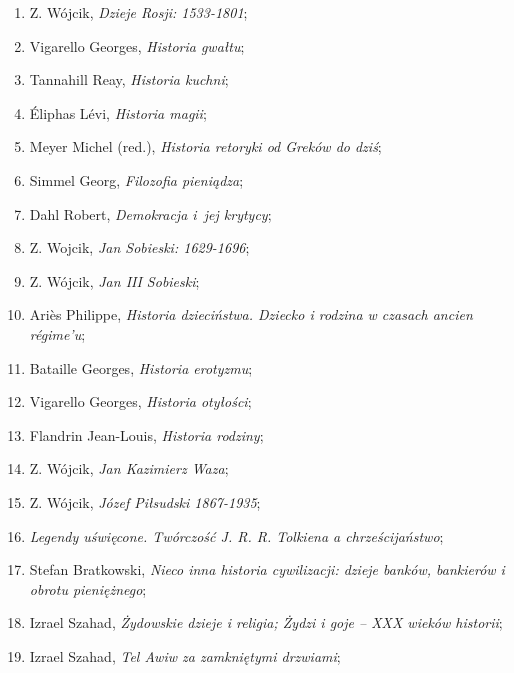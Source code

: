 \documentclass[a4paper,11pt]{article}
\begin{document}
\begin{enumerate}
\item Z. Wójcik, \textit{Dzieje Rosji: 1533-1801};

\item Vigarello Georges, \textit{Historia gwałtu};

\item Tannahill Reay, \textit{Historia kuchni};

\item Éliphas Lévi, \textit{Historia magii};

\item Meyer Michel (red.), \textit{Historia retoryki od Greków do dziś};

\item Simmel Georg, \textit{Filozofia pieniądza};

\item Dahl Robert, \textit{Demokracja i~jej krytycy};

\item Z. Wojcik, \textit{Jan Sobieski: 1629-1696};

\item Z. Wójcik, \textit{Jan III Sobieski};

\item Ariès Philippe, \textit{Historia dzieciństwa. Dziecko i rodzina w
    czasach ancien régime’u};

\item Bataille Georges, \textit{Historia erotyzmu};

\item Vigarello Georges, \textit{Historia otyłości};

\item Flandrin Jean-Louis, \textit{Historia rodziny};

\item Z. Wójcik, \textit{Jan Kazimierz Waza};

\item Z. Wójcik, \textit{Józef Piłsudski 1867-1935};

\item \textit{Legendy uświęcone. Twórczość J. R. R. Tolkiena a
    chrześcijaństwo};

\item Stefan Bratkowski, \textit{Nieco inna historia cywilizacji: dzieje
    banków, bankierów i obrotu pieniężnego};

\item Izrael Szahad, \textit{Żydowskie dzieje i religia; Żydzi i goje –
    XXX wieków historii};

\item Izrael Szahad, \textit{Tel Awiw za zamkniętymi drzwiami};


\end{enumerate}
\end{document}
